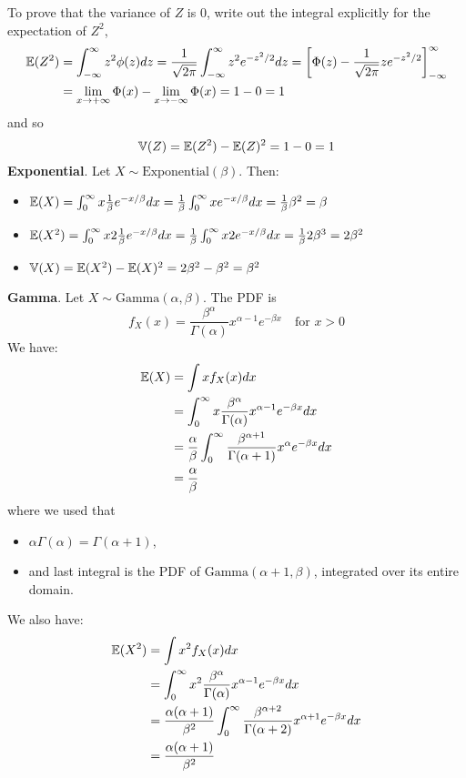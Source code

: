 To prove that the variance of \(Z\) is 0, write out the integral
explicitly for the expectation of \(Z^{2}\),
\begin{align*}
\EXP(Z^{2}) 
& = \int_{-\infty}^{\infty} z^{2} \phi(z) dz 
  = \frac{1}{\sqrt{2 \pi}} \int_{-\infty}^{\infty} z^{2} e^{-z^{2}/2} dz
  = \left[ \Phi(z) - \frac{1}{\sqrt{2 \pi}}  z e^{-z^{2}/2} \right]_{-\infty}^{\infty} 
\\
& = \lim_{x \rightarrow +\infty} \Phi(x) - \lim_{x \rightarrow -\infty} \Phi(x) 
  = 1 - 0 
  = 1
\end{align*}
and so
\[
\operatorname{\mathbb{V}}(Z) = \operatorname{\mathbb{E}}(Z^{2}) - \operatorname{\mathbb{E}}(Z)^{2} = 1 - 0 = 1
\]
\textbf{Exponential}. Let \(X \sim \text{Exponential}(\beta)\). Then:
\begin{itemize}[tightlist]
\item
  \( \operatorname{\mathbb{E}}(X) = \int_{0}^{\infty} x \frac{1}{\beta} e^{-x / \beta} dx = \frac{1}{\beta} \int_{0}^{\infty} x e^{-x / \beta}
  dx = \frac{1}{\beta} \beta^{2} = \beta \)
\item
  \( \operatorname{\mathbb{E}}(X^{2}) = \int_{0}^{\infty} x2
  \frac{1}{\beta} e^{-x / \beta} dx = \frac{1}{\beta}
  \int_{0}^{\infty} x2 e^{-x / \beta} dx =
  \frac{1}{\beta} 2\beta^{3} = 2 \beta^{2} \)
\item
  \( \operatorname{\mathbb{V}}(X) = \operatorname{\mathbb{E}}(X^{2}) - \operatorname{\mathbb{E}}(X)^{2} =
  2\beta^{2} - \beta^{2} = \beta^{2} \)
\end{itemize}
\textbf{Gamma}. Let \(X \sim \text{Gamma}(\alpha, \beta)\). The PDF is
\[
f_X(x) = \frac{\beta^\alpha}{\Gamma(\alpha)} x^{\alpha - 1} e^{-\beta x} \quad \text{for } x > 0
\]
We have:
\begin{align*}
\operatorname{\mathbb{E}}(X) 
&= \int x f_X(x) dx \\
&= \int_{0}^{\infty} x \frac{\beta^\alpha}{\Gamma(\alpha)} x^{\alpha - 1} e^{-\beta x} dx \\
&= \frac{\alpha}{\beta} \int_{0}^{\infty}\frac{\beta^{\alpha + 1}}{\Gamma(\alpha + 1)} x^\alpha e^{-\beta x} dx \\
&= \frac{\alpha}{\beta}
\end{align*}
where we used that
\begin{itemize}[tightlist]
\item
  \(\alpha \Gamma(\alpha) = \Gamma(\alpha + 1)\),
\item
  and last integral is the PDF of \(\text{Gamma}(\alpha + 1, \beta)\),
  integrated over its entire domain.
\end{itemize}
We also have:
\begin{align*}
\operatorname{\mathbb{E}}(X^{2}) 
&= \int x^{2} f_X(x) dx \\
&= \int_{0}^{\infty} x^{2} \frac{\beta^\alpha}{\Gamma(\alpha)} x^{\alpha - 1} e^{-\beta x} dx \\
&= \frac{\alpha (\alpha + 1)}{\beta^{2}} \int_{0}^{\infty}\frac{\beta^{\alpha + 2}}{\Gamma(\alpha + 2)} x^{\alpha + 1} e^{-\beta x} dx \\
&= \frac{\alpha (\alpha + 1)}{\beta^{2}}
\end{align*}
